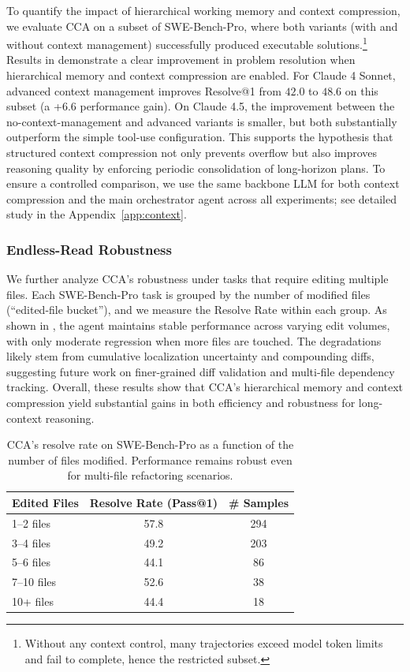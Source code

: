 To quantify the impact of hierarchical working memory and context compression, we evaluate CCA on a subset of SWE-Bench-Pro, where both variants (with and without context management) successfully produced executable solutions.\footnote{Without any context control, many trajectories exceed model token limits and fail to complete, hence the restricted subset.} 
Results in  demonstrate a clear improvement in problem resolution when hierarchical memory and context compression are enabled. For Claude 4 Sonnet, advanced context management improves Resolve@1 from $42.0$ to $48.6$ on this subset (a +6.6 performance gain). On Claude 4.5, the improvement between the no-context-management and advanced variants is smaller, but both substantially outperform the simple tool-use configuration.  
This supports the hypothesis that structured context compression not only prevents overflow but also improves reasoning quality by enforcing periodic consolidation of long-horizon plans.
To ensure a controlled comparison, we use the same backbone LLM for both context compression and the main orchestrator agent across all experiments; see detailed study in the Appendix~\ref{app:context}. 







\subsubsection{Endless-Read Robustness}

We further analyze CCA's robustness under tasks that require editing multiple files. Each SWE-Bench-Pro task is grouped by the number of modified files (``edited-file bucket''), and we measure the Resolve Rate within each group. As shown in , the agent maintains stable performance across varying edit volumes, with only moderate regression when more files are touched. The degradations likely stem from cumulative localization uncertainty and compounding diffs, suggesting future work on finer-grained diff validation and multi-file dependency tracking.
Overall, these results show that CCA’s hierarchical memory and context compression yield substantial gains in both efficiency and robustness for long-context reasoning.

\begin{table}[h]
\centering
\begin{tabular}{l c c}
\toprule
\textbf{Edited Files} & \textbf{Resolve Rate (Pass@1)} & \textbf{\# Samples} \\
\midrule
1--2 files  & 57.8 & 294 \\
3--4 files  & 49.2 & 203 \\
5--6 files  & 44.1 & 86  \\
7--10 files & 52.6 & 38  \\
10+ files   & 44.4 & 18  \\
\bottomrule
\end{tabular}
\caption{CCA's resolve rate on SWE-Bench-Pro as a function of the number of files modified. 
Performance remains robust even for multi-file refactoring scenarios.}
\label{tab:endless_read}
\end{table}


